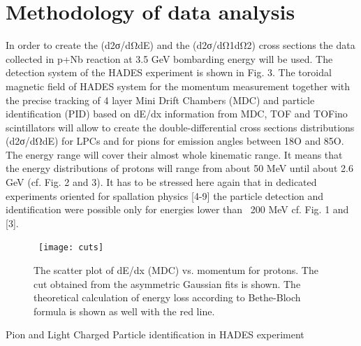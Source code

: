 \section{Methodology of data analysis}
In order to create the (d2σ/dΩdE) and the (d2σ/dΩ1dΩ2) cross sections the data collected in p+Nb reaction at 3.5 GeV bombarding energy will be used.  The detection system of the HADES experiment is shown in Fig. 3. 
The toroidal magnetic field of HADES system for the momentum measurement together with the precise tracking of 4 layer Mini Drift Chambers (MDC) and particle identification (PID) based on dE/dx information from MDC, TOF and TOFino scintillators will allow to create the double-differential cross sections distributions (d2σ/dΩdE) for LPCs and for pions for emission angles between 18O and 85O. The energy range will cover their almost whole kinematic range. It means that the energy distributions of protons will range from about 50 MeV until about 2.6 GeV (cf. Fig. 2 and 3). It has to be stressed here again that in dedicated experiments oriented for spallation physics [4-9] the particle detection and identification were possible only for energies lower than ~200 MeV cf. Fig. 1 and [3].    
\begin{figure}
  \centering\
  \texttt{[image: cuts]}
  \caption{The scatter plot of dE/dx (MDC) vs. momentum for protons. The cut obtained from 
the asymmetric Gaussian fits is shown. The theoretical calculation of energy loss according to Bethe-Bloch formula is shown as well with the red line.}
  \label{fig:18OGEMINIS2}
\end{figure}
Pion and Light Charged Particle identification in HADES experiment 

